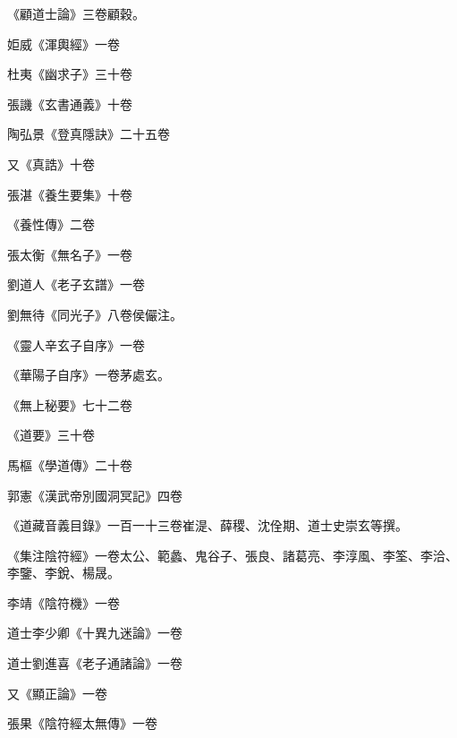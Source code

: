 \begin{pinyinscope}
 《顧道士論》三卷顧穀。



 姖威《渾輿經》一卷



 杜夷《幽求子》三十卷



 張譏《玄書通義》十卷



 陶弘景《登真隱訣》二十五卷



 又《真誥》十卷



 張湛《養生要集》十卷



 《養性傳》二卷



 張太衡《無名子》一卷



 劉道人《老子玄譜》一卷



 劉無待《同光子》八卷侯儼注。



 《靈人辛玄子自序》一卷



 《華陽子自序》一卷茅處玄。



 《無上秘要》七十二卷



 《道要》三十卷



 馬樞《學道傳》二十卷



 郭憲《漢武帝別國洞冥記》四卷



 《道藏音義目錄》一百一十三卷崔湜、薛稷、沈佺期、道士史崇玄等撰。



 《集注陰符經》一卷太公、範蠡、鬼谷子、張良、諸葛亮、李淳風、李筌、李洽、李鑒、李銳、楊晟。



 李靖《陰符機》一卷



 道士李少卿《十異九迷論》一卷



 道士劉進喜《老子通諸論》一卷



 又《顯正論》一卷



 張果《陰符經太無傳》一卷




\end{pinyinscope}
